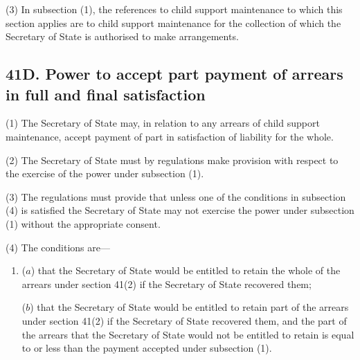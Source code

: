 \documentclass[12pt,a4paper]{article}
\begin{document}
(3)
In subsection (1), the references to child support maintenance to which this section applies are to child support maintenance for the collection of which the Secretary of State is authorised to make arrangements.


\subsection{41D. Power to accept part payment of arrears in full and final satisfaction}

(1) The 
Secretary of State
may, in relation to any arrears of child support  maintenance, accept payment of part in satisfaction of liability for the whole.

(2)
The Secretary of State must by regulations make provision with respect to the exercise of the power under subsection (1).

(3)
The regulations must provide that unless one of the conditions in subsection
(4)
is satisfied the 
Secretary of State %
may not exercise the power under subsection (1) without the appropriate consent.

(4)
The conditions are---
\begin{enumerate}\item[]
($a$) that the 
Secretary of State %
would be entitled to retain the whole of the arrears under section 41(2) if 
the Secretary of State %
recovered them;

($b$) that the 
Secretary of State %
would be entitled to retain part of the arrears under section 41(2) if 
the Secretary of State %
recovered them, and the part of the arrears that the 
Secretary of State %
would not be entitled to retain is equal to or less than the payment accepted under subsection (1).
\end{enumerate}
\end{document}
